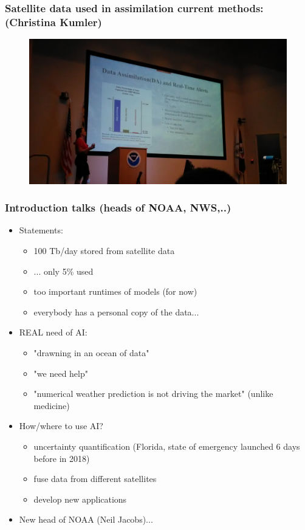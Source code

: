 \documentclass{beamer}
\begin{document}
\begin{frame}
\frametitle{Satellite data used in assimilation current methods: (Christina Kumler)}
\begin{figure}
	\includegraphics[width=\linewidth]{figs/P_20190424_091240.jpg}
\end{figure}
\end{frame}


\begin{frame}
\frametitle{Introduction talks (heads of NOAA, NWS,..)}

\begin{itemize}

\item Statements: 
	\begin{itemize}
		\item 100 Tb/day stored from satellite data
		\item ... only 5\% used
		\item too important runtimes of models (for now)
		\item everybody has a personal copy of the data...
	\end{itemize}
\item REAL need of AI:
	\begin{itemize}
		\item "drawning in an ocean of data"
		\item "we need help"
		\item "numerical weather prediction is not driving the market" (unlike medicine)
	\end{itemize}
\item How/where to use AI?
	\begin{itemize}
		\item uncertainty quantification (Florida, state of emergency launched 6 days before in 2018)
		\item fuse data from different satellites
		\item develop new applications
	\end{itemize}
\item New head of NOAA (Neil Jacobs)...
\end{itemize}
\end{frame}
\end{document}
